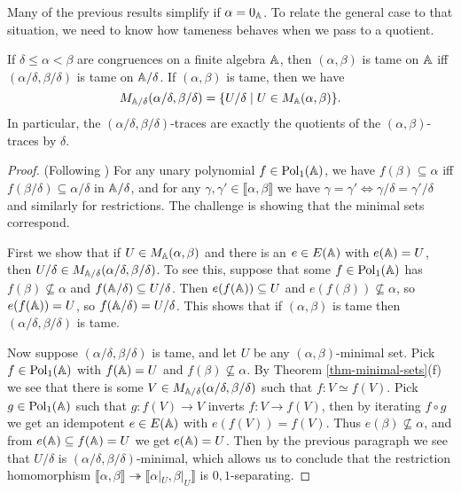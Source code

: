 \begin{appendices}
Many of the previous results simplify if $\alpha = 0_{\mathbb{A}}$. To relate the general case to that situation, we need to know how tameness behaves when we pass to a quotient.

\begin{prop}\label{prop-tame-quotient} If $\delta \le \alpha < \beta$ are congruences on a finite algebra $\mathbb{A}$, then $(\alpha,\beta)$ is tame on $\mathbb{A}$ iff $(\alpha/\delta, \beta/\delta)$ is tame on $\mathbb{A}/\delta$. If $(\alpha,\beta)$ is tame, then we have
\[
M_{\mathbb{A}/\delta}(\alpha/\delta,\beta/\delta) = \{U/\delta \mid U \in M_{\mathbb{A}}(\alpha,\beta)\}.
\]
In particular, the $(\alpha/\delta,\beta/\delta)$-traces are exactly the quotients of the $(\alpha,\beta)$-traces by $\delta$.
\end{prop}
\begin{proof} (Following \cite{hobby-mckenzie}) For any unary polynomial $f \in \operatorname{Pol}_1(\mathbb{A})$, we have $f(\beta) \subseteq \alpha$ iff $f(\beta/\delta) \subseteq \alpha/\delta$ in $\mathbb{A}/\delta$, and for any $\gamma, \gamma' \in \llbracket \alpha, \beta \rrbracket$ we have $\gamma = \gamma' \iff \gamma/\delta = \gamma'/\delta$ and similarly for restrictions. The challenge is showing that the minimal sets correspond.%

First we show that if $U \in M_{\mathbb{A}}(\alpha,\beta)$ and there is an $e \in E(\mathbb{A})$ with $e(\mathbb{A}) = U$, then $U/\delta \in M_{\mathbb{A}/\delta}(\alpha/\delta,\beta/\delta)$. To see this, suppose that some $f \in \operatorname{Pol}_1(\mathbb{A})$ has $f(\beta) \not\subseteq \alpha$ and $f(\mathbb{A}/\delta) \subseteq U/\delta$. Then $e(f(\mathbb{A})) \subseteq U$ and $e(f(\beta)) \not\subseteq \alpha$, so $e(f(\mathbb{A})) = U$, so $f(\mathbb{A}/\delta) = U/\delta$. This shows that if $(\alpha,\beta)$ is tame then $(\alpha/\delta, \beta/\delta)$ is tame.

Now suppose $(\alpha/\delta, \beta/\delta)$ is tame, and let $U$ be any $(\alpha,\beta)$-minimal set. Pick $f \in \operatorname{Pol}_1(\mathbb{A})$ with $f(\mathbb{A}) = U$ and $f(\beta) \not\subseteq \alpha$. By Theorem \ref{thm-minimal-sets}(f) we see that there is some $V \in M_{\mathbb{A}/\delta}(\alpha/\delta, \beta/\delta)$ such that $f : V \simeq f(V)$. Pick $g \in \operatorname{Pol}_1(\mathbb{A})$ such that $g : f(V) \rightarrow V$ inverts $f : V \rightarrow f(V)$, then by iterating $f\circ g$ we get an idempotent $e \in E(\mathbb{A})$ with $e(f(V)) = f(V)$. Thus $e(\beta) \not\subseteq \alpha$, and from $e(\mathbb{A}) \subseteq f(\mathbb{A}) = U$ we get $e(\mathbb{A}) = U$. Then by the previous paragraph we see that $U/\delta$ is $(\alpha/\delta,\beta/\delta)$-minimal, which allows us to conclude that the restriction homomorphism $\llbracket \alpha, \beta \rrbracket \twoheadrightarrow \llbracket \alpha|_U, \beta|_U \rrbracket$ is $0,1$-separating.


\end{proof}
\end{appendices}
